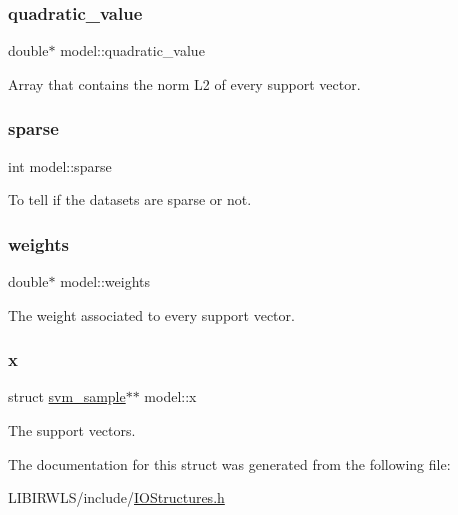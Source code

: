 \subsubsection{\texorpdfstring{quadratic\+\_\+value}{quadratic\_value}}
{\ttfamily double$\ast$ model\+::quadratic\+\_\+value}

Array that contains the norm L2 of every support vector. \hypertarget{structmodel_ad00b5b9bbafcd18eb6367c90d9471231}{}\label{structmodel_ad00b5b9bbafcd18eb6367c90d9471231} 
\subsubsection{\texorpdfstring{sparse}{sparse}}
{\ttfamily int model\+::sparse}

To tell if the datasets are sparse or not. \hypertarget{structmodel_a658dab89d4b4b1a5bd28cdfb4abafe39}{}\label{structmodel_a658dab89d4b4b1a5bd28cdfb4abafe39} 
\subsubsection{\texorpdfstring{weights}{weights}}
{\ttfamily double$\ast$ model\+::weights}

The weight associated to every support vector. \hypertarget{structmodel_a81da41c8731f95de344a068d302eb336}{}\label{structmodel_a81da41c8731f95de344a068d302eb336} 
\subsubsection{\texorpdfstring{x}{x}}
{\ttfamily struct \hyperlink{structsvm__sample}{svm\+\_\+sample}$\ast$$\ast$ model\+::x}

The support vectors. 

The documentation for this struct was generated from the following file\+:\begin{DoxyCompactItemize}
\item 
L\+I\+B\+I\+R\+W\+L\+S/include/\hyperlink{IOStructures_8h}{I\+O\+Structures.\+h}\end{DoxyCompactItemize}
